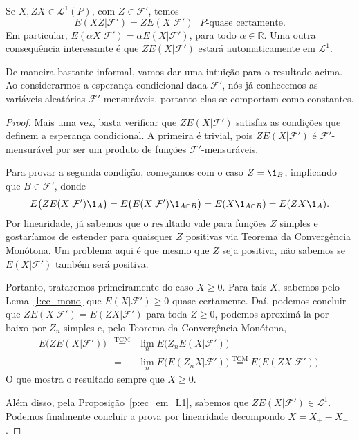 \begin{proposition}
  \label{p:EZX_ZEX}
  Se $X, ZX \in \mathcal{L}^1(P)$, com $Z \in \mathcal{F}'$, temos
  \begin{equation}
    E(XZ|\mathcal{F}') = Z E(X|\mathcal{F}') \text{ $P$-quase certamente}.
  \end{equation}
  Em particular, $E(\alpha X|\mathcal{F}') = \alpha E(X|\mathcal{F}')$, para todo $\alpha \in \mathbb{R}$.
  Uma outra consequência interessante é que $Z E(X|\mathcal{F}')$ estará automaticamente em $\mathcal{L}^1$.
\end{proposition}

De maneira bastante informal, vamos dar uma intuição para o resultado acima.
Ao considerarmos a esperança condicional dada $\mathcal{F}'$, nós já conhecemos as variáveis aleatórias $\mathcal{F}'$-mensuráveis, portanto elas se comportam como constantes.

\begin{proof}
  Mais uma vez, basta verificar que $Z E(X|\mathcal{F}')$ satisfaz as condições que definem a esperança condicional.
  A primeira é trivial, pois $Z E(X|\mathcal{F}')$ é $\mathcal{F}'$-mensurável por ser um produto de funções $\mathcal{F}'$-mensuráveis.

  Para provar a segunda condição, começamos com o caso $Z = \1_B$, implicando que $B \in \mathcal{F}'$, donde
  \begin{equation*}
    E\big(ZE(X|\mathcal{F}') \1_A \big) = E\big( E(X|\mathcal{F}') \1_{A \cap B}\big) = E(X \1_{A \cap B}) = E(ZX \1_A).
  \end{equation*}
  Por linearidade, já sabemos que o resultado vale para funções $Z$ simples e gostaríamos de estender para quaisquer $Z$ positivas via Teorema da Convergência Monótona.
  Um problema aqui é que mesmo que $Z$ seja positiva, não sabemos se $E(X|\mathcal{F}')$ também será positiva.

  Portanto, trataremos primeiramente do caso $X \geq 0$.
  Para tais $X$, sabemos pelo Lema~\ref{l:ec_mono} que $E(X|\mathcal{F}') \geq 0$ quase certamente.
  Daí, podemos concluir que $Z E(X|\mathcal{F}') = E(ZX|\mathcal{F}')$ para toda $Z \geq 0$, podemos aproximá-la por baixo por $Z_n$ simples e, pelo Teorema da Convergência Monótona,
  \begin{equation}
    \begin{array}{e}
      E\big( Z E(X|\mathcal{F}') \big) & \overset{\text{TCM}}= & \lim_n E\big( Z_n E(X|\mathcal{F}') \big)\\
      & = & \lim_n E\big( E(Z_n X|\mathcal{F}') \big) \overset{\text{TCM}}= E\big( E(ZX|\mathcal{F}') \big).
    \end{array}
  \end{equation}
  O que mostra o resultado sempre que $X \geq 0$.

  Além disso, pela Proposição~\ref{p:ec_em_L1}, sabemos que $Z E(X|\mathcal{F}') \in \mathcal{L}^1$.
  Podemos finalmente concluir a prova por linearidade decompondo $X = X_+ - X_-$.
\end{proof}

